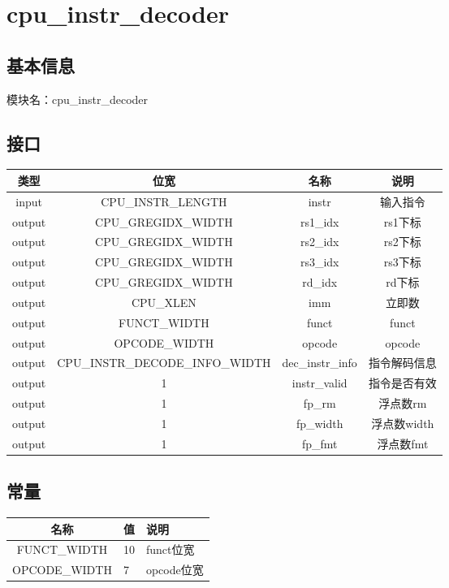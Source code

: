 \section{cpu\_instr\_decoder}
\subsection{基本信息}
模块名：cpu\_instr\_decoder
\subsection{接口}
\begin{tabular}{|c|c|c|c|}
    \hline
    类型    &   位宽    &   名称    &   说明\\\hline
    input   &   CPU\_INSTR\_LENGTH   &   instr &   输入指令\\\hline
    output   &   CPU\_GREGIDX\_WIDTH &   rs1\_idx    &   rs1下标\\\hline
    output   &   CPU\_GREGIDX\_WIDTH &   rs2\_idx    &   rs2下标\\\hline
    output   &   CPU\_GREGIDX\_WIDTH &   rs3\_idx    &   rs3下标\\\hline
    output   &   CPU\_GREGIDX\_WIDTH &   rd\_idx    &   rd下标\\\hline
    output   &   CPU\_XLEN &   imm    &   立即数\\\hline
    output   &   FUNCT\_WIDTH &   funct    &   funct\\\hline
    output   &   OPCODE\_WIDTH &   opcode    &   opcode\\\hline
    output   &   CPU\_INSTR\_DECODE\_INFO\_WIDTH &   dec\_instr\_info    &   指令解码信息\\\hline
    output   &   1 &   instr\_valid    &   指令是否有效\\\hline
    output   &   1 &   fp\_rm    &   浮点数rm\\\hline
    output   &   1 &   fp\_width    &   浮点数width\\\hline
    output   &   1 &   fp\_fmt    &   浮点数fmt\\\hline
\end{tabular}
\subsection{常量}
\begin{tabular}{|c|p{3cm}|p{6cm}|}
    \hline
    名称    &   值  &   说明\\\hline
    FUNCT\_WIDTH & 10 & funct位宽\\\hline
    OPCODE\_WIDTH & 7 & opcode位宽\\\hline
\end{tabular}
